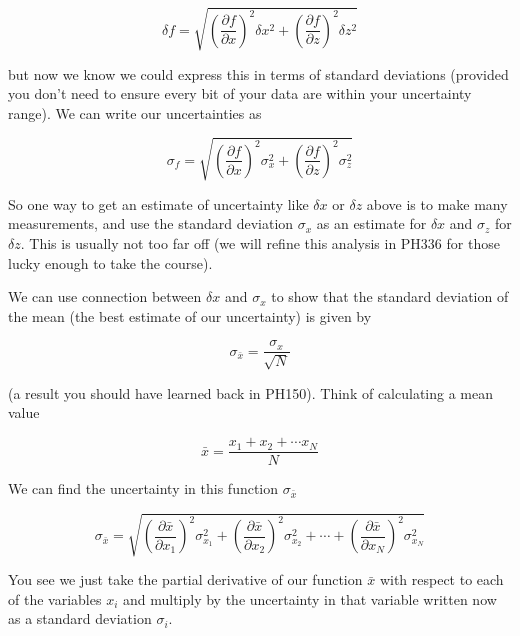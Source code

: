 \begin{equation*}
	\delta f=\sqrt{\left( \frac{\partial f}{\partial x}\right) ^{2}\delta x^{2}+\left( \frac{\partial f}{\partial z}\right) ^{2}\delta z^{2}}
\end{equation*}

but now we know we could express this in terms of standard deviations (provided you don't need to ensure every bit of your data are within your uncertainty range). We can write our uncertainties as 

\begin{equation*}
	\sigma _{f}=\sqrt{\left( \frac{\partial f}{\partial x}\right) ^{2}\sigma_{x}^{2}+\left( \frac{\partial f}{\partial z}\right) ^{2}\sigma _{z}^{2}}
\end{equation*}

So one way to get an estimate of uncertainty like $\delta x$ or $\delta z$ above is to make many measurements, and use the standard deviation $\sigma_{x}$ as an estimate for $\delta x$ and $\sigma _{z}$ for $\delta z.$ This is usually not too far off (we will refine this analysis in PH336 for those lucky enough to take the course).

We can use connection between $\delta x$ and $\sigma _{x}$ to show that the standard deviation of the mean (the best estimate of our uncertainty) is given by

\begin{equation*}
	\sigma _{\bar{x}}=\frac{\sigma _{x}}{\sqrt{N}}
\end{equation*}

(a result you should have learned back in PH150). Think of calculating a mean value

\begin{equation*}
	\bar{x}=\frac{x_{1}+x_{2}+\cdots x_{N}}{N}
\end{equation*}

We can find the uncertainty in this function $\sigma _{\bar{x}}$

\begin{equation*}
	\sigma _{\bar{x}}=\sqrt{\left( \frac{\partial \bar{x}}{\partial x_{1}} \right) ^{2}\sigma _{x_{1}}^{2}+\left( \frac{\partial \bar{x}}{\partial x_{2}}\right) ^{2}\sigma _{x_{2}}^{2}+\cdots +\left( \frac{\partial \bar{x}}{\partial x_{N}}\right) ^{2}\sigma _{x_{N}}^{2}}
\end{equation*}

You see we just take the partial derivative of our function $\bar{x}$ with respect to each of the variables $x_{i}$ and multiply by the uncertainty in that variable written now as a standard deviation $\sigma _{i}.$


